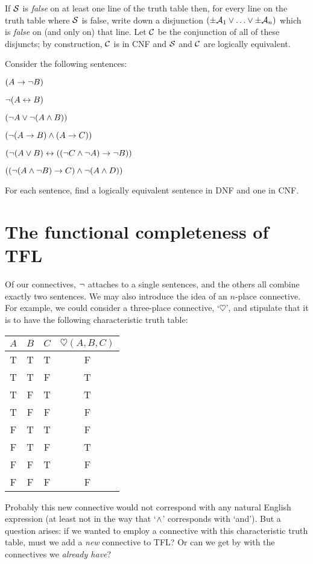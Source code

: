 	If $\mathcal{S}$ is \emph{false} on at least one line of the truth table then, for every line on the truth table where $\mathcal{S}$ is false, write down a disjunction $(\pm\mathcal{A}_1 \vee \ldots \vee \pm\mathcal{A}_n)$ which is \emph{false} on (and only on) that line. Let $\mathcal{C}$ be the conjunction of all of these disjuncts; by construction, $\mathcal{C}$ is in CNF and $\mathcal{S}$ and $\mathcal{C}$ are logically equivalent.

\practiceproblems
\problempart
\label{pr.DNF}
Consider the following sentences:
	\begin{earg}
		\item $(A \rightarrow \neg B)$
		\item $\neg (A \leftrightarrow B)$
		\item $(\neg A \vee \neg (A \wedge B))$
		\item $(\neg (A \rightarrow B ) \wedge (A \rightarrow C))$
		\item $(\neg (A \vee B) \leftrightarrow ((\neg C \wedge \neg A) \rightarrow \neg B))$
		\item $((\neg (A \wedge \neg B) \rightarrow C) \wedge \neg (A \wedge D))$
	\end{earg}
        For each sentence, find a logically equivalent sentence in DNF and one in CNF.
        
\section{The functional completeness of TFL}

Of our connectives, $\neg$ attaches to a single sentences, and the others all combine exactly two sentences. We may also introduce the idea of an $n$-place connective. For example, we could consider a three-place connective, `$\heartsuit$', and stipulate that it is to have the following characteristic truth table:
\begin{center}
\begin{tabular}{c c c | c}
$A$ & $B$ & $C$ & $\heartsuit(A,B,C)$\\
\hline
 T & T & T & F \\
 T & T & F & T \\
 T & F & T & T \\
 T & F & F & F \\
 F & T & T & F \\
 F & T & F & T \\
 F & F & T & F \\
 F & F & F & F
\end{tabular}
\end{center}
Probably this new connective would not correspond with any natural English expression (at least not in the way that `$\wedge$' corresponds with `and'). But a question arises: if we wanted to employ a connective with this characteristic truth table, must we add a \emph{new} connective to TFL? Or can we get by with the connectives we \emph{already have}?

